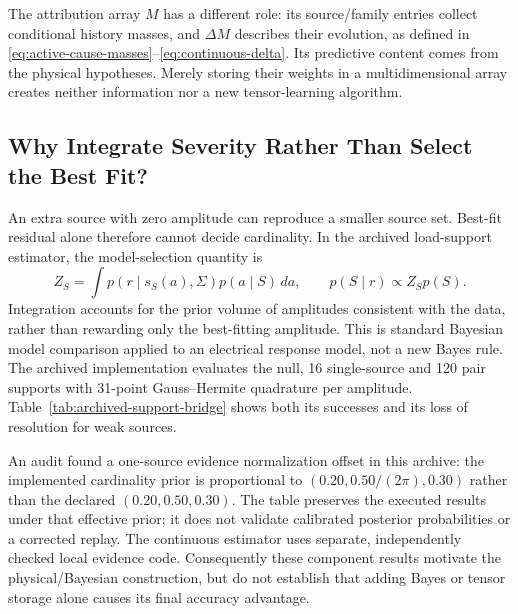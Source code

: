 The attribution array $M$ has a different role: its source/family entries
collect conditional history masses, and $\Delta M$ describes their
evolution, as defined in \eqref{eq:active-cause-masses}--\eqref{eq:continuous-delta}.
Its predictive content comes from the physical hypotheses. Merely storing
their weights in a multidimensional array creates neither information
nor a new tensor-learning algorithm.

\subsection{Why Integrate Severity Rather Than Select the Best Fit?}
An extra source with zero amplitude can reproduce a smaller source set.
Best-fit residual alone therefore cannot decide cardinality. In the
archived load-support estimator, the model-selection quantity is
\begin{equation}
 Z_S=\int p(r\mid s_S(a),\Sigma)p(a\mid S)\,da,
 \qquad p(S\mid r)\propto Z_Sp(S).
 \label{eq:bridge-batch-evidence}
\end{equation}
Integration accounts for the prior volume of amplitudes consistent with
the data, rather than rewarding only the best-fitting amplitude. This is
standard Bayesian model comparison applied to an electrical response
model, not a new Bayes rule. The archived implementation evaluates the
null, 16 single-source and 120 pair supports with 31-point Gauss--Hermite
quadrature per amplitude. Table~\ref{tab:archived-support-bridge} shows
both its successes and its loss of resolution for weak sources.

\begin{table}[t]\centering\small
\caption{Archived joint cardinality-and-support decisions. Onset, load
family and operating context are supplied. These are noise replays of
shared physical trajectories, not independent continuous detections.}
\label{tab:archived-support-bridge}

\end{table}

An audit found a one-source evidence normalization offset in this
archive: the implemented cardinality prior is proportional to
$(0.20,0.50/(2\pi),0.30)$ rather than the declared $(0.20,0.50,0.30)$.
The table preserves the executed results under that effective prior;
it does not validate calibrated posterior probabilities or a corrected
replay. The continuous estimator uses separate, independently checked
local evidence code. Consequently these component results motivate the
physical/Bayesian construction, but do not establish that adding Bayes
or tensor storage alone causes its final accuracy advantage.

